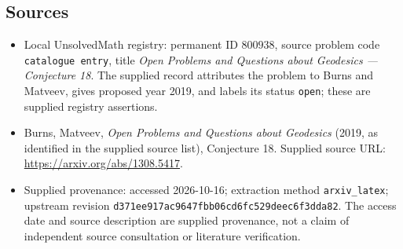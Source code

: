 \documentclass[11pt]{article}
\begin{document}
\subsection{Sources}
\begin{itemize}
\item Local UnsolvedMath registry: permanent ID $800938$, source problem code \texttt{catalogue entry}, title \emph{Open Problems and Questions about Geodesics --- Conjecture 18}. The supplied record attributes the problem to Burns and Matveev, gives proposed year 2019, and labels its status \texttt{open}; these are supplied registry assertions.
\item Burns, Matveev, \emph{Open Problems and Questions about Geodesics} (2019, as identified in the supplied source list), Conjecture 18. Supplied source URL: \url{https://arxiv.org/abs/1308.5417}.
\item Supplied provenance: accessed 2026-10-16; extraction method \texttt{arxiv\_latex}; upstream revision \texttt{d371ee917ac9647fbb06cd6fc529deec6f3dda82}. The access date and source description are supplied provenance, not a claim of independent source consultation or literature verification.
\end{itemize}
\end{document}
